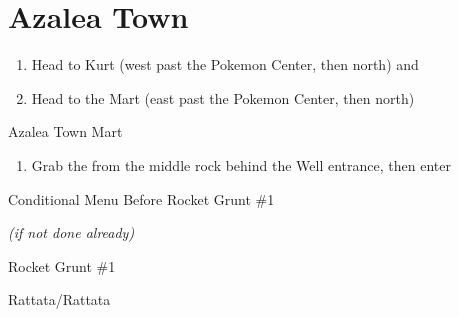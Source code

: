 \chapter{Azalea Town}
\vspace{0.5mm}

\begin{paracol}{2}
\begin{enumerate}
	\item Head to Kurt (west past the Pokemon Center, then north) and 
	\item Head to the Mart (east past the Pokemon Center, then north)
\end{enumerate}

\begin{shop}{Azalea Town Mart}
	\varwb
	\begin{buy}
		\item \shopHl{(3\pointDown)} \superPotion{} 
		\item \shopHl{(2\pointDown)} \repel{} 
		\item \shopHl{(\pointDown)} \antidote{} 
		\item \shopHl{(\pointDown)} \paralyzeHeal{} 
	\end{buy}
	\varwe
\end{shop}

\begin{enumerate}[resume]
	\item Grab the  from the middle rock behind the Well entrance, then enter
\end{enumerate}

\switchcolumn*
\begin{menu}{Conditional Menu Before Rocket Grunt \#1}
	\varwb
	\begin{packMenu}
		\item \potion{}
		\begin{notes}
			\small{\item \textbf{\fullHeal{}} \textit{(if not done already)}}
		\end{notes}
	\end{packMenu}
	\varwe
\end{menu}

\switchcolumn
\begin{trainer}{Rocket Grunt \#1}
	\varwb
	\begin{fightSection}{Rattata/Rattata}
		\item {} \waterGun
	\end{fightSection}
	\varwe
\end{trainer}


\end{paracol}

